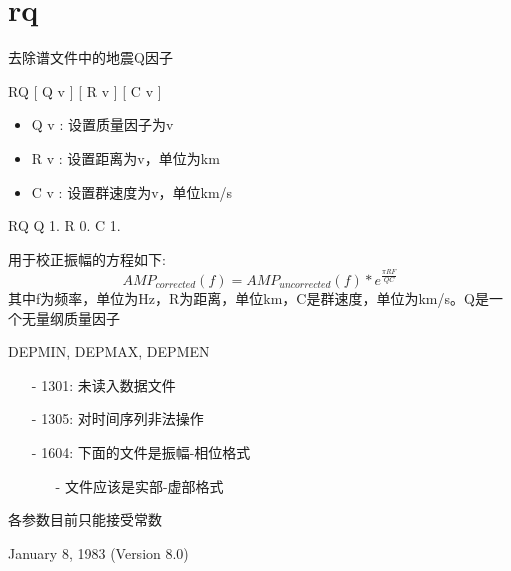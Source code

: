 \section{rq}
\label{cmd:rq}

去除谱文件中的地震Q因子

RQ [ Q v ] [ R v ] [ C v ]

\begin{itemize}
\item Q v : 设置质量因子为v 
\item R v : 设置距离为v，单位为km 
\item C v : 设置群速度为v，单位km/s 
\end{itemize}

RQ Q 1. R 0. C 1.

用于校正振幅的方程如下:
\[ AMP_{corrected}(f) = AMP_{uncorrected}(f) * e^{\frac{\pi R F}{Q C}} \]
其中f为频率，单位为Hz，R为距离，单位km，C是群速度，单位为km/s。Q是一个无量纲质量因子

DEPMIN, DEPMAX, DEPMEN

\begin{itemize}
\item[-]1301: 未读入数据文件
\item[-]1305: 对时间序列非法操作
\end{itemize}

\begin{itemize}
\item[-]1604: 下面的文件是振幅-相位格式
	\begin{itemize}
	\item[-]文件应该是实部-虚部格式
	\end{itemize}
\end{itemize}

各参数目前只能接受常数

January 8, 1983 (Version 8.0)
